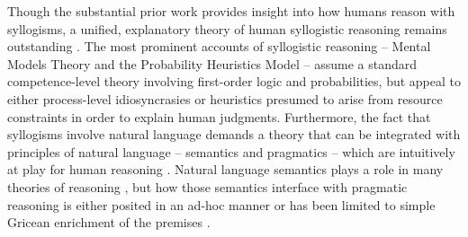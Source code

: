 \documentclass[floatsintext, doc]{apa6}
\begin{document}
Though the substantial prior work provides insight into how humans reason with syllogisms, a unified, explanatory theory of human syllogistic reasoning remains outstanding \cite{Khemlani2012}. 
The most prominent accounts of syllogistic reasoning -- Mental Models Theory \cite{johnson1975models, johnson2015logic} and the Probability Heuristics Model  \cite{Chater1999} -- assume a standard competence-level theory involving first-order logic and probabilities, but appeal to either process-level idiosyncrasies or heuristics presumed to arise from resource constraints in order to explain human judgments. 
Furthermore, the fact that syllogisms involve natural language demands a theory that can be integrated with principles of natural language -- semantics and pragmatics -- which are intuitively at play for human reasoning \cite{sperber1986relevance,mercier2017enigma}.
Natural language semantics plays a role in many theories of reasoning \cite{JL1978, Khemlani2012, geurts2003reasoning}, but how those semantics interface with pragmatic reasoning is either posited in an ad-hoc manner \cite{Chater1999} or has been limited to simple Gricean enrichment of the premises \cite{Roberts2001}.	





\end{document}
